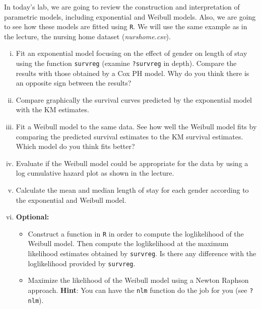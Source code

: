 In today's lab, we are going to review the construction and interpretation of 
parametric models, including exponential and Weibull models. Also, we are going to 
see how these models are fitted using \verb|R|. We will use the same example as in 
the lecture, the nursing home dataset (\emph{nurshome.csv}). 
\begin{enumerate}[(i)]
\item Fit an exponential model focusing on the effect of gender on length of stay using the function \verb|survreg| (examine \verb|?survreg| in depth). Compare the results with those obtained by a Cox PH model. Why do you think there is an opposite sign between the results?
\item Compare graphically the survival curves predicted by the exponential model with the KM estimates.
\item Fit a Weibull model to the same data. See how well the Weibull model fits by comparing the predicted survival estimates to the KM survival estimates. Which model do you think fits better? 
\item Evaluate if the Weibull model could be appropriate for the data by using a log cumulative hazard plot as shown in the lecture.
\item Calculate the mean and median length of stay for each gender according to the 
exponential and Weibull model.
\item \textbf{Optional:} 
\begin{itemize}
\item Construct a function in \verb|R| in order to compute the loglikelihood of the Weibull model. Then compute the loglikelihood at the maximum likelihood estimates obtained by \verb|survreg|. Is there any difference with the loglikelihood provided by \verb|survreg|.
\item Maximize the likelihood of the Weibull model using a Newton Raphson approach. \textbf{Hint}: You can have the \verb|nlm| function do the job for you (see \verb|?nlm|). 
\end{itemize}
\end{enumerate}
